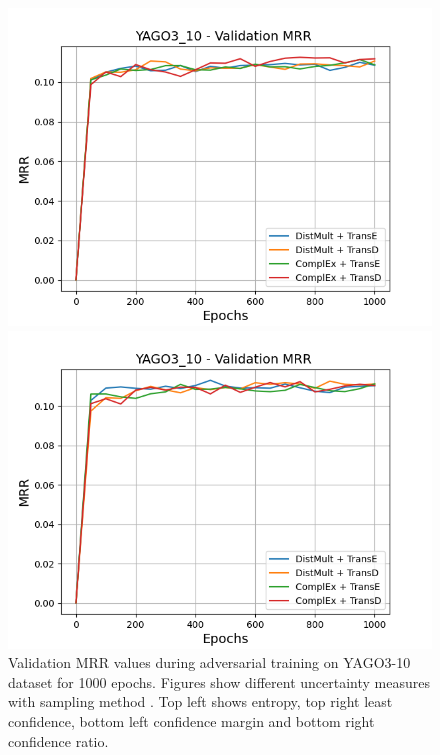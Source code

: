 \begin{figure}[H]
\begin{minipage}{.45\textwidth}
      \includegraphics[width=0.9\linewidth]{figures/results/gan_train/not_pretrained/uncertainty/max_distribution/confidence_margin/yago3_10/uncertainty_yago3_10_mrrs.png}
    \end{minipage}%
    \begin{minipage}{.45\textwidth}
      \centering
      \includegraphics[width=0.9\linewidth]{figures/results/gan_train/not_pretrained/uncertainty/max_distribution/confidence_ratio/yago3_10/uncertainty_yago3_10_mrrs.png}
    \end{minipage}%
    \caption{Validation MRR values during adversarial training on \textsc{YAGO3-10} dataset for 1000 epochs. 
    Figures show different uncertainty measures with sampling method  \ussoftmax.
    Top left shows entropy, top right least confidence, 
    bottom left confidence margin and bottom right confidence ratio.}
    \label{fig:advtrain_metrics_yago3_10}
\end{figure}




